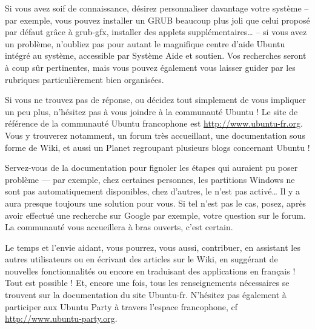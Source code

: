 Si vous avez soif de connaissance, désirez personnaliser davantage votre système -- par exemple, vous pouvez installer un GRUB beaucoup plus joli que celui proposé par défaut grâce à grub-gfx, installer des applets supplémentaires\ldots{} -- si vous avez un problème, n'oubliez pas pour autant le magnifique centre d'aide Ubuntu intégré au système, accessible par Système \FlecheDroite Aide et soutien. Vos recherches seront à coup sûr pertinentes, mais vous pouvez également vous laisser guider par les rubriques particulièrement bien organisées.\par
Si vous ne trouvez pas de réponse, ou décidez tout simplement de vous impliquer un peu plus, n'hésitez pas à vous joindre à la communauté Ubuntu ! Le site de référence de la communauté Ubuntu francophone est \url{http://www.ubuntu-fr.org}. Vous y trouverez notamment, un forum très accueillant, une documentation sous forme de Wiki, et aussi un Planet regroupant plusieurs blogs concernant Ubuntu !\par
Servez-vous de la documentation pour fignoler les étapes qui auraient pu poser problème --- par exemple, chez certaines personnes, les partitions Windows ne sont pas automatiquement disponibles, chez d'autres, le  n'est pas activé\ldots{} Il y a aura presque toujours une solution pour vous. Si tel n'est pas le cas, posez, après avoir effectué une recherche sur Google par exemple, votre question sur le forum. La communauté vous accueillera à bras ouverts, c'est certain.\par
Le temps et l'envie aidant, vous pourrez, vous aussi, contribuer, en assistant les autres utilisateurs ou en écrivant des articles sur le Wiki, en suggérant de nouvelles fonctionnalités ou encore en traduisant des applications en français ! Tout est possible ! Et, encore une fois, tous les renseignements nécessaires se trouvent sur la documentation du site Ubuntu-fr. N'hésitez pas également à participer aux Ubuntu Party à travers l'espace francophone, cf \url{http://www.ubuntu-party.org}.\par
